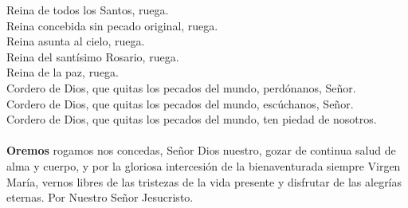 \documentclass[10pt,a4paper,oneside]{book}
\begin{document}
\begin{minipage}[t]{0.475\textwidth}
      Reina de todos los Santos, ruega.\\
      Reina concebida sin pecado original, ruega.\\
      Reina asunta al cielo, ruega.\\
      Reina del santísimo Rosario, ruega.\\
      Reina de la paz, ruega.\\
      Cordero de Dios, que quitas los pecados del mundo, perdónanos, Señor.\\
      Cordero de Dios, que quitas los pecados del mundo, escúchanos, Señor.\\
      Cordero de Dios, que quitas los pecados del mundo, ten piedad de nosotros.\\
      \ruegapornosotrossalve\\

      \textbf{Oremos}
       rogamos nos concedas, Señor Dios nuestro, gozar de continua salud de alma y cuerpo, y por la gloriosa intercesión de la
      bienaventurada siempre Virgen María, vernos libres de las tristezas de la vida presente y disfrutar de las alegrías eternas.
      Por Nuestro Señor Jesucristo. \\
\end{minipage}
\end{document}
